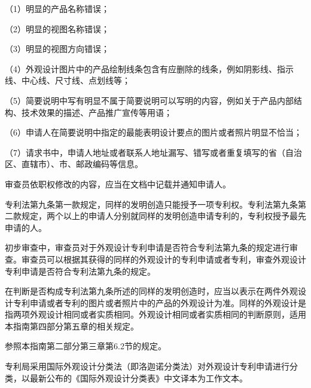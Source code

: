 {\setlength{\parindent}{17.1bp}（1）明显的产品名称错误；\par}

{\setlength{\parindent}{17.1bp}（2）明显的视图名称错误；\par}

{\setlength{\parindent}{17.1bp}（3）明显的视图方向错误；\par}

{\setlength{\parindent}{17.1bp}（4）外观设计图片中的产品绘制线条包含有应删除的线条，例如阴影线、指示线、中心线、尺寸线、点划线等；\par}

{\setlength{\parindent}{17.1bp}（5）简要说明中写有明显不属于简要说明可以写明的内容，例如关于产品内部结构、技术效果的描述、产品推广宣传等用语；\par}

{\setlength{\parindent}{17.1bp}（6）申请人在简要说明中指定的最能表明设计要点的图片或者照片明显不恰当；\par}

{\setlength{\parindent}{17.1bp}（7）请求书中，申请人地址或者联系人地址漏写、错写或者重复填写的省（自治区、直辖市）、市、邮政编码等信息。\par}

{\setlength{\parindent}{21.8bp}审查员依职权修改的内容，应当在文档中记载并通知申请人。\par}

专利法第九条第一款规定，同样的发明创造只能授予一项专利权。专利法第九条第二款规定，两个以上的申请人分别就同样的发明创造申请专利的，专利权授予最先申请的人。

初步审查中，审查员对于外观设计专利申请是否符合专利法第九条的规定进行审查。审查员可以根据其获得的同样的外观设计的专利申请或者专利，审查外观设计专利申请是否符合专利法第九条的规定。

在判断是否构成专利法第九条所述的同样的发明创造时，应当以表示在两件外观设计专利申请或者专利的图片或者照片中的产品的外观设计为准。同样的外观设计是指两项外观设计相同或者实质相同。外观设计相同或者实质相同的判断原则，适用本指南第四部分第五章的相关规定。

参照本指南第二部分第三章第6.2节的规定。

专利局采用国际外观设计分类法（即洛迦诺分类法）对外观设计专利申请进行分类，以最新公布的《国际外观设计分类表》中文译本为工作文本。

